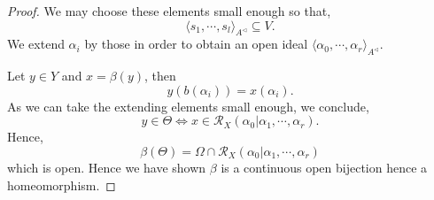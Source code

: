 \documentclass[8pt]{article}
\numberwithin{equation}{section}
\newcommand{\cR}[0]{\mathcal{R}}
\newcommand{\ab}[1]{\vert #1 \vert}
\begin{document}
\begin{proof}
We may choose these elements small enough so that,
\begin{equation*}
    \langle s_1,\cdots,s_l\rangle_{A^\triangleleft}\subseteq V.
\end{equation*}
We extend $\alpha_i$ by those in order to obtain an open ideal $\langle \alpha_0,\cdots,\alpha_r\rangle_{A^\triangleleft}$.
\par Let $y\in Y$ and $x=\beta(y)$, then 
\begin{equation*}
    y(b(\alpha_i)) = x(\alpha_i).
\end{equation*}
As we can take the extending elements small enough, we conclude,
\begin{equation*}
    y\in\Theta\iff x\in\cR_X(\alpha_0|\alpha_1,\cdots,\alpha_r).
\end{equation*}
Hence,
\begin{equation*}
    \beta(\Theta) = \Omega\cap \cR_X(\alpha_0|\alpha_1,\cdots,\alpha_r)
\end{equation*}
which is open. Hence we have shown $\beta$ is a continuous open bijection hence a homeomorphism.
\end{proof}
\end{document}
